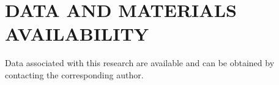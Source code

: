 \section{DATA AND MATERIALS AVAILABILITY}
Data associated with this research are available and can be obtained by contacting the corresponding author.





\newpage
\listoffigures




